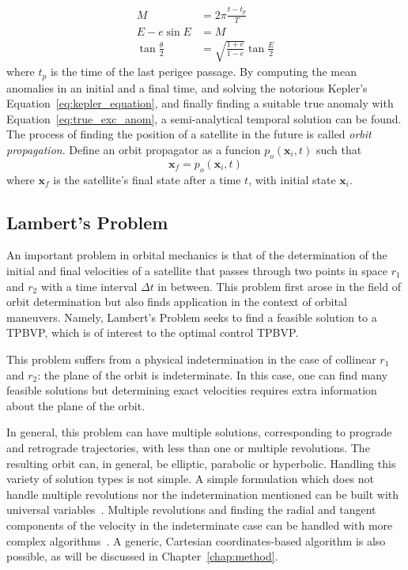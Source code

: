 \begin{align} 
        M &= 2\pi \frac{t - t_p}{T} \\
        E - e \sin{E} &= M \label{eq:kepler_equation}\\
        \tan{\frac{\theta}{2}} &= \sqrt{\frac{1+e}{1-e}} \tan{\frac{E}{2}} \label{eq:true_exc_anom}
\end{align}
where \(t_p\) is the time of the last perigee passage. By computing the mean anomalies in an initial and a final time, and solving the notorious Kepler's Equation~\eqref{eq:kepler_equation}, and finally finding a suitable true anomaly with Equation~\eqref{eq:true_exc_anom}, a semi-analytical temporal solution can be found. The process of finding the position of a satellite in the future is called \textit{orbit propagation}. Define an orbit propagator as a funcion \(p_o(\mathbf{x}_i, t)\) such that
\begin{equation} \label{eq:orbit_propagator}
    \mathbf{x}_f = p_o(\mathbf{x}_i, t)
\end{equation}
where \(\mathbf{x}_f\) is the satellite's final state after a time \(t\), with initial state \(\mathbf{x}_i\).

\subsection{Lambert's Problem}

An important problem in orbital mechanics is that of the determination of the initial and final velocities of a satellite that passes through two points in space \(r_1\) and \(r_2\) with a time interval \(\Delta t\) in between. This problem first arose in the field of orbit determination but also finds application in the context of orbital maneuvers. Namely, Lambert's Problem seeks to find a feasible solution to a TPBVP, which is of interest to the optimal control TPBVP. 

This problem suffers from a physical indetermination in the case of collinear \(r_1\) and \(r_2\): the plane of the orbit is indeterminate. In this case, one can find many feasible solutions but determining exact velocities requires extra information about the plane of the orbit.\

In general, this problem can have multiple solutions, corresponding to prograde and retrograde trajectories, with less than one or multiple revolutions. The resulting orbit can, in general, be elliptic, parabolic or hyperbolic. Handling this variety of solution types is not simple. A simple formulation which does not handle multiple revolutions nor the indetermination mentioned can be built with universal variables~\cite{curtis2015orbital}. Multiple revolutions and finding the radial and tangent components of the velocity in the indeterminate case can be handled with more complex algorithms~\cite{sukhanov}. A generic, Cartesian coordinates-based algorithm is also possible, as will be discussed in Chapter~\ref{chap:method}.


